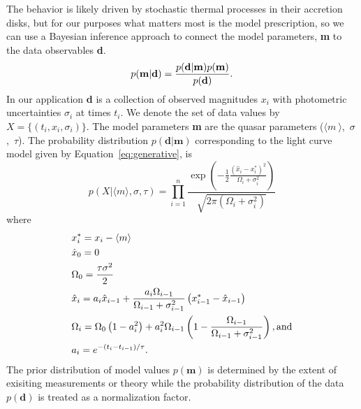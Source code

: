 \documentclass{emulateapj}
\begin{document}
The behavior is likely
driven by stochastic thermal processes in their accretion disks, but
for our purposes what matters most is the model prescription, so we
can use a Bayesian inference approach to connect the model parameters,
{\bf m} to the data observables {\bf d}.
\begin{equation}
p({\mathbf m} | {\mathbf d}) = 
{{p({\mathbf d} | {\mathbf m})p({\mathbf m})}
\over{p({\mathbf  d})}}. \nonumber 
\end{equation}
In our application {\bf d} is a collection of observed magnitudes ${x_{i}}$ with 
photometric uncertainties $\sigma_i$ at times ${t_i}$. We denote the set of data values by $X=\{(t_i,x_i,\sigma_i)\}$. The model parameters {\bf m} are 
the quasar parameters ($\langle m~\rangle$,~$\sigma$,~$\tau$). The probability distribution 
$p({\mathbf d} | {\mathbf m})$ corresponding to the light curve model given by Equation~\ref{eq:generative}, 
is 
\begin{equation} 
p(X|\langle m\rangle, \sigma,\tau) =
\prod_{i=1}^{n}
\frac{
\exp\left(-\frac{1}{2}%
\frac{\left(\hat{x}_i-x^{*}_i\right)^2}{\Omega_i+\sigma_i^2} 
\right)
}
{
\sqrt{2\pi\left(\Omega_i+\sigma_i^2\right)}
}
\end{equation}
where 
\begin{alignat}{1}
& x_{i}^{*} = x_i-\langle m \rangle \nonumber\\
& \hat{x}_0 = 0   \nonumber\\
& \Omega_{0}=\frac{\tau\sigma^2}{2} \nonumber\\
& \hat{x}_i = a_i\hat{x}_{i-1} + \frac{a_i\Omega_{i-1}}{\Omega_{i-1}+\sigma^2_{i-1}} \left(x^{*}_{i-1}-\hat{x}_{i-1}\right) \nonumber\\
& \Omega_{i}=\Omega_{0}\left(1-a_{i}^2\right) +
a_{i}^2\Omega_{i-1}\left(1-\frac{\Omega_{i-1}}{\Omega_{i-1}+\sigma_{i-1}^2}\right),
{\rm and} \nonumber\\
& a_i = e^{-\left(t_i-t_{i-1}\right)/\tau}. \nonumber
\end{alignat}
The prior distribution of model values $p(\mathbf{m})$ is determined by the extent of exisiting measurements or theory while the probability distribution of the data $p(\mathbf{d})$ is treated as a normalization factor.
\end{document}
